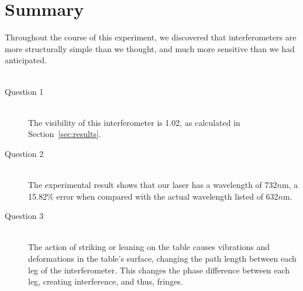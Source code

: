 \section{Summary}

Throughout the course of this experiment, we discovered that interferometers are
more structurally simple than we thought, and much more sensitive than we had
anticipated.\\
   
\hfill \\ 
\begin{description}
    \item[Question 1] \hfill \\
        The visibility of this interferometer is 1.02, as calculated in
        Section~\ref{sec:results}.
    \item[Question 2] \hfill \\
        The experimental result shows that our laser has a wavelength of
        732$n$m, a 15.82\% error when compared with the actual wavelength listed
        of 632$n$m.
    \item[Question 3] \hfill \\
        The action of striking or leaning on the table causes vibrations and
        deformations in the table's surface, changing the path length between
        each leg of the interferometer. This changes the phase difference
        between each leg, creating interference, and thus, fringes.
\end{description}
